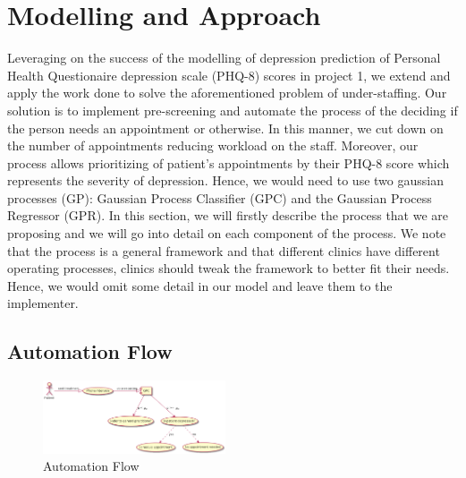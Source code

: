 \documentclass{article}
\begin{document}
	\section{Modelling and Approach}
	Leveraging on the success of the modelling of depression prediction of Personal Health Questionaire depression scale (PHQ-8) scores in project 1, we extend and apply the work done to solve the aforementioned problem of under-staffing.
	Our solution is to implement pre-screening and automate the process of the deciding if the person needs an appointment or otherwise.
	In this manner, we cut down on the number of appointments reducing workload on the staff. 
	Moreover, our process allows prioritizing of patient's appointments by their PHQ-8 score which represents the severity of depression.
	Hence, we would need to use two gaussian processes (GP): Gaussian Process Classifier (GPC) and the Gaussian Process Regressor (GPR). 
	In this section, we will firstly describe the process that we are proposing and we will go into detail on each component of the process. 
	We note that the process is a general framework and that different clinics have different operating processes, clinics should tweak the framework to better fit their needs. 
	Hence, we would omit some detail in our model and leave them to the implementer.

	\subsection{Automation Flow} \label{af}
	\begin{figure}[h]
 		\begin{center}
		\includegraphics[width=0.48\textwidth]{automation} 
  		\end{center}
  		\caption{Automation Flow}
  		\label{auto_flow} 
 	\end{figure}

\end{document}
